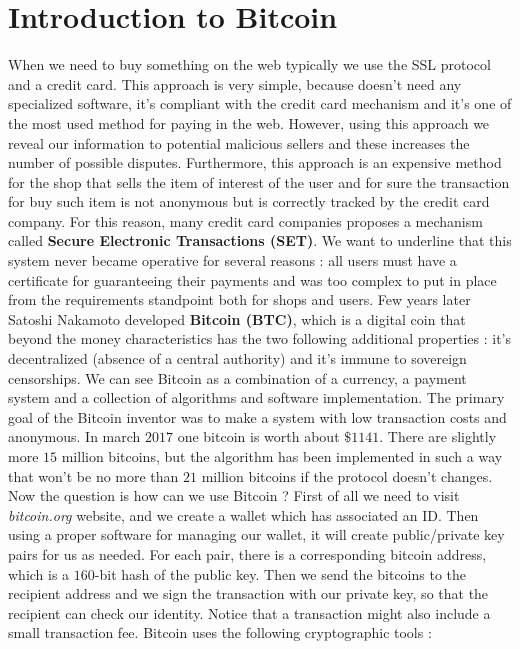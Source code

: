 \section{Introduction to Bitcoin}
When we need to buy something on the web typically we use the SSL protocol and a credit card. This approach is very simple, because doesn't need any specialized software, it's compliant with the credit card mechanism and it's one of the most used method for paying in the web. However, using this approach we reveal our information to potential malicious sellers and these increases the number of possible disputes. Furthermore, this approach is an expensive method for the shop that sells the item of interest of the user and for sure the transaction for buy such item is not anonymous but is correctly tracked by the credit card company. For this reason, many credit card companies proposes a mechanism called \textbf{Secure Electronic Transactions (SET)}. We want to underline that this system never became operative for several reasons : all users must have a certificate for guaranteeing their payments and was too complex to put in place from the requirements standpoint both for shops and users. Few years later Satoshi Nakamoto developed \textbf{Bitcoin (BTC)}, which is a digital coin that beyond the money characteristics has the two following additional properties : it's decentralized (absence of a central authority) and it's immune to sovereign censorships. We can see Bitcoin as a combination of a currency, a payment system and a collection of algorithms and software implementation. The primary goal of the Bitcoin inventor was to make a system with low transaction costs and anonymous. In march $2017$ one bitcoin is worth about $\$ 1141$. There are slightly more $15$ million bitcoins, but the algorithm has been implemented in such a way that won't be no more than $21$ million bitcoins if the protocol doesn't changes. Now the question is how can we use Bitcoin ? First of all we need to visit \textit{bitcoin.org} website, and we create a wallet which has associated an ID. Then using a proper software for managing our wallet, it will create public/private key pairs for us as needed. For each pair, there is a corresponding bitcoin address, which is a $160$-bit hash of the public key. Then we send the bitcoins to the recipient address and we sign the transaction with our private key, so that the recipient can check our identity. Notice that a transaction might also include a small transaction fee. Bitcoin uses the following cryptographic tools :
